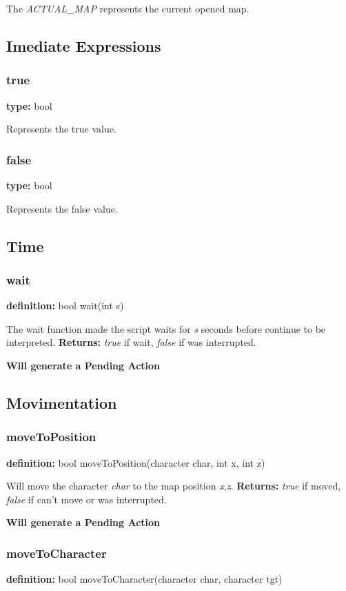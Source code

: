\documentclass[ letterpaper,12pt]{article}
\begin{document}
The {\it ACTUAL\_MAP} represents the current opened map.


\subsection{Imediate Expressions}

\subsubsection{true}
{\bf type:} bool

Represents the true value.

\subsubsection{false}
{\bf type:} bool

Represents the false value.

\subsection{Time}

\subsubsection{wait}
{\bf definition:} bool wait(int s)

The wait function made the script waits for {\it s} seconds before continue to be
interpreted. {\bf Returns:} {\it true} if wait, {\it false} if was interrupted.

{\bf Will generate a Pending Action}

\subsection{Movimentation}

\subsubsection{moveToPosition}
{\bf definition:} bool moveToPosition(character char, int x, int z)

Will move the character {\it char} to the map position {\it x,z}. {\bf Returns:} 
{\it true} if moved, {\it false} if can't move or was interrupted.

{\bf Will generate a Pending Action}

\subsubsection{moveToCharacter}
{\bf definition:} bool moveToCharacter(character char, character tgt)
\end{document}
